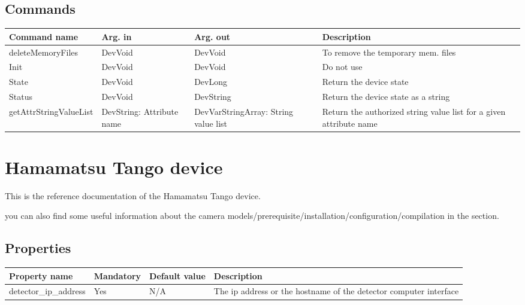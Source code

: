 \documentclass[letterpaper,10pt,english]{sphinxmanual}
\begin{document}
\section{Commands}
\label{Eiger/eiger:commands}
\begin{tabulary}{\linewidth}{|L|L|L|L|}
\hline
\textsf{\relax 
Command name
} & \textsf{\relax 
Arg. in
} & \textsf{\relax 
Arg. out
} & \textsf{\relax 
Description
}\\
\hline
deleteMemoryFiles
 & 
DevVoid
 & 
DevVoid
 & 
To remove the temporary mem. files
\\
\hline
Init
 & 
DevVoid
 & 
DevVoid
 & 
Do not use
\\
\hline
State
 & 
DevVoid
 & 
DevLong
 & 
Return the device state
\\
\hline
Status
 & 
DevVoid
 & 
DevString
 & 
Return the device state as a string
\\
\hline
getAttrStringValueList
 & 
DevString:
Attribute name
 & 
DevVarStringArray:
String value list
 & 
Return the authorized string value list for
a given attribute name
\\
\hline\end{tabulary}



\chapter{Hamamatsu Tango device}
\label{Hamamatsu/hamamatsu:hamamatsu-tango-device}\label{Hamamatsu/hamamatsu::doc}
This is the reference documentation of the Hamamatsu Tango device.

you can also find some useful information about the camera models/prerequisite/installation/configuration/compilation in the  section.


\section{Properties}
\label{Hamamatsu/hamamatsu:properties}
\begin{tabulary}{\linewidth}{|L|L|L|L|}
\hline
\textsf{\relax 
Property name
} & \textsf{\relax 
Mandatory
} & \textsf{\relax 
Default value
} & \textsf{\relax 
Description
}\\
\hline
detector\_ip\_address
 & 
Yes
 & 
N/A
 & 
The ip address or the hostname of the detector computer interface
\\
\hline\end{tabulary}
\end{document}
